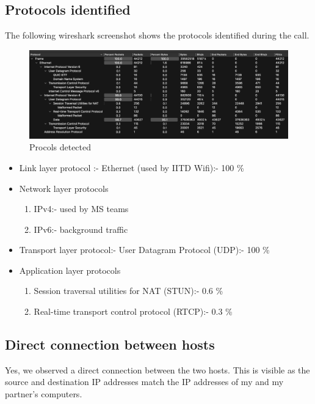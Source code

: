 \documentclass{article}
\begin{document}
\subsection{Protocols identified}
The following wireshark screenshot shows the protocols identified during the call.

    \begin{figure}[H]
    \centering
    \includegraphics[width=\textwidth]{protocols.png}
    \caption*{Procols detected}
    \end{figure}

\begin{itemize}
    \item Link layer protocol :- Ethernet (used by IITD Wifi):- 100 \%
    \item Network layer protocols
        \begin{enumerate}
            \item IPv4:- used by MS teams
            \item IPv6:- background traffic
        \end{enumerate}
    \item Transport layer protocol:- User Datagram Protocol (UDP):- 100 \%
    \item Application layer protocols
        \begin{enumerate}
            \item Session traversal utilities for NAT (STUN):- 0.6 \%
            \item Real-time transport control protocol (RTCP):- 0.3 \%
        \end{enumerate}
    
\end{itemize}

\subsection{Direct connection between hosts}
Yes, we observed a direct connection between the two hosts. This is visible as the source and destination IP addresses match the IP addresses of my and my partner's computers. 
\end{document}
